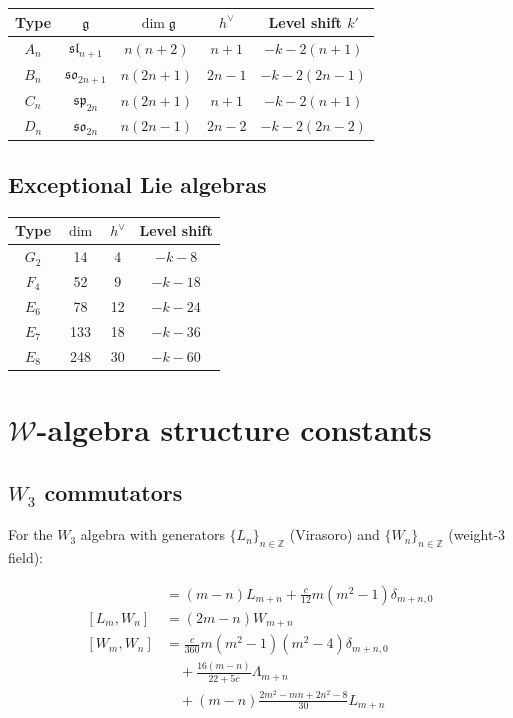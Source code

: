\begin{center}
\begin{tabular}{|c|c|c|c|c|}
\hline
Type & $\mathfrak{g}$ & $\dim \mathfrak{g}$ & $h^\vee$ & Level shift $k'$ \\
\hline
$A_n$ & $\mathfrak{sl}_{n+1}$ & $n(n+2)$ & $n+1$ & $-k - 2(n+1)$ \\
\hline
$B_n$ & $\mathfrak{so}_{2n+1}$ & $n(2n+1)$ & $2n-1$ & $-k - 2(2n-1)$ \\
\hline
$C_n$ & $\mathfrak{sp}_{2n}$ & $n(2n+1)$ & $n+1$ & $-k - 2(n+1)$ \\
\hline
$D_n$ & $\mathfrak{so}_{2n}$ & $n(2n-1)$ & $2n-2$ & $-k - 2(2n-2)$ \\
\hline
\end{tabular}
\end{center}

\subsection{Exceptional Lie algebras}

\begin{center}
\begin{tabular}{|c|c|c|c|}
\hline
Type & $\dim$ & $h^\vee$ & Level shift \\
\hline
$G_2$ & 14 & 4 & $-k-8$ \\
\hline
$F_4$ & 52 & 9 & $-k-18$ \\
\hline
$E_6$ & 78 & 12 & $-k-24$ \\
\hline
$E_7$ & 133 & 18 & $-k-36$ \\
\hline
$E_8$ & 248 & 30 & $-k-60$ \\
\hline
\end{tabular}
\end{center}

\section{$\mathcal{W}$-algebra structure constants}

\subsection{\texorpdfstring{$W_3$ commutators}{W 3 commutators}}

For the $W_3$ algebra with generators $\{L_n\}_{n \in \mathbb{Z}}$ (Virasoro) and $\{W_n\}_{n \in \mathbb{Z}}$ (weight-3 field):

\begin{align}
[L_m, L_n] &= (m-n)L_{m+n} + \frac{c}{12}m(m^2-1)\delta_{m+n,0} \\
[L_m, W_n] &= (2m-n)W_{m+n} \\
[W_m, W_n] &= \frac{c}{360}m(m^2-1)(m^2-4)\delta_{m+n,0} \\
&\quad + \frac{16(m-n)}{22+5c}\Lambda_{m+n} \\
&\quad + (m-n)\frac{2m^2 - mn + 2n^2 - 8}{30}L_{m+n}
\end{align}

